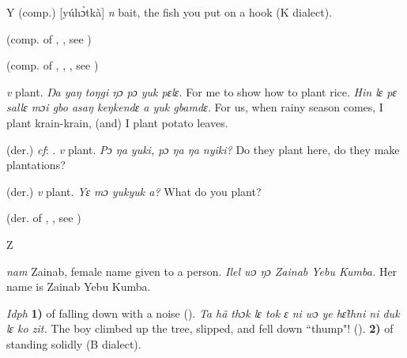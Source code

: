 \begin{letter}{Y}
 (comp.) [yúhɔ̀tkà] \textit{n} bait, the fish you put on a hook (K dialect). 

 (comp. of , , see ) 

 (comp. of , , , see ) 

 \textit{v} plant. \textit{Ŋa yaŋ toŋgi ŋɔ pɔ yuk pɛlɛ.} For me to show how to plant rice. \textit{Hin lɛ pɛ sallɛ mɔi gbo asaŋ keŋkendɛ a yuk gbamdɛ.} For us, when rainy season comes, I plant krain-krain, (and) I plant potato leaves. 

 (der.) \textit{cf}: . \textit{v} plant. \textit{Pɔ ŋa yuki, pɔ ŋa ŋa nyiki?} Do they plant here, do they make plantations?

 (der.) \textit{v} plant. \textit{Yɛ mɔ yukyuk a?} What do you plant?

 (der. of , , see ) 

\end{letter}
\begin{letter}{Z}

 \textit{nam} Zainab, female name given to a person. \textit{Ilel wɔ ŋɔ Zainab Yebu Kumba.} Her name is Zainab Yebu Kumba.

 \textit{Idph} \textbf{1)} of falling down with a noise (\citealt{Pichl1967}). \textit{Ta hã thɔk lɛ tok ɛ ni wɔ ye hɛ̃thni ni duk lɛ ko zit.} The boy climbed up the tree, slipped, and fell down “thump"! (\citealt{Pichl1967}). \textbf{2)} of standing solidly (B dialect).

\end{letter}

